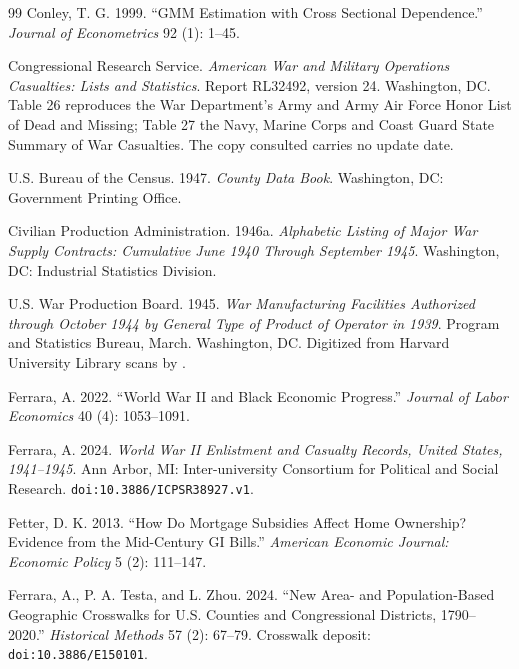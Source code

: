 \documentclass[12pt]{article}
\newcommand{\textcite}[1]{\citet{#1}}
\begin{document}
\begin{thebibliography}{99}
Conley, T. G. 1999. ``GMM Estimation with Cross Sectional Dependence.'' \emph{Journal of Econometrics} 92 (1): 1--45.

Congressional Research Service. \emph{American War and Military Operations Casualties: Lists and Statistics}. Report RL32492, version 24. Washington, DC. Table 26 reproduces the War Department's Army and Army Air Force Honor List of Dead and Missing; Table 27 the Navy, Marine Corps and Coast Guard State Summary of War Casualties. The copy consulted carries no update date.

U.S. Bureau of the Census. 1947. \emph{County Data Book}. Washington, DC: Government Printing Office.

Civilian Production Administration. 1946a. \emph{Alphabetic Listing of Major War Supply Contracts: Cumulative June 1940 Through September 1945}. Washington, DC: Industrial Statistics Division.

U.S. War Production Board. 1945. \emph{War Manufacturing Facilities Authorized through October 1944 by General Type of Product of Operator in 1939}. Program and Statistics Bureau, March. Washington, DC. Digitized from Harvard University Library scans by \textcite{garin2025}.

Ferrara, A. 2022. ``World War II and Black Economic Progress.'' \emph{Journal of Labor Economics} 40 (4): 1053--1091.

Ferrara, A. 2024. \emph{World War II Enlistment and Casualty Records, United States, 1941--1945}. Ann Arbor, MI: Inter-university Consortium for Political and Social Research. \texttt{doi:10.3886/ICPSR38927.v1}.

Fetter, D. K. 2013. ``How Do Mortgage Subsidies Affect Home Ownership? Evidence from the Mid-Century GI Bills.'' \emph{American Economic Journal: Economic Policy} 5 (2): 111--147.

Ferrara, A., P. A. Testa, and L. Zhou. 2024. ``New Area- and Population-Based Geographic Crosswalks for U.S. Counties and Congressional Districts, 1790--2020.'' \emph{Historical Methods} 57 (2): 67--79. Crosswalk deposit: \texttt{doi:10.3886/E150101}.


\end{thebibliography}
\end{document}
